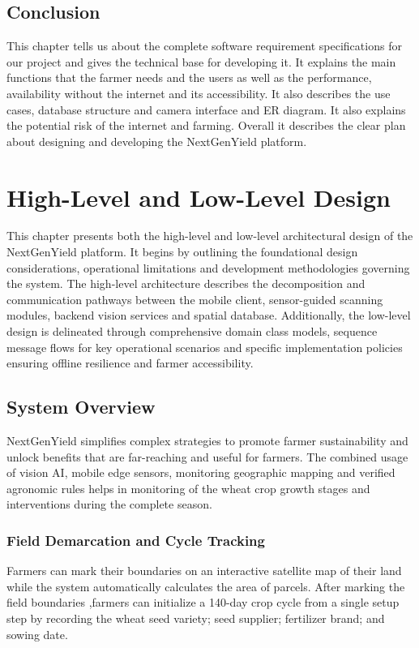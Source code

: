 \documentclass{FastFyp}
\begin{document}
\section{Conclusion}
This chapter tells us about the complete software requirement specifications for our project and gives the technical base for developing it. It explains the main functions that the farmer needs and the users as well as the performance, availability without the internet and its accessibility. It also describes the use cases, database structure and camera interface and ER diagram. It also explains the potential risk of the internet and farming. Overall it describes the clear plan about designing and developing the NextGenYield platform. 

\chapter{High-Level and Low-Level Design}
This chapter presents both the high-level and low-level architectural design of the NextGenYield platform. It begins by outlining the foundational design considerations, operational limitations and development methodologies governing the system. The high-level architecture describes the decomposition and communication pathways between the mobile client, sensor-guided scanning modules, backend vision services and spatial database. Additionally, the low-level design is delineated through comprehensive domain class models, sequence message flows for key operational scenarios and specific implementation policies ensuring offline resilience and farmer accessibility.

 
\section{System Overview}
NextGenYield simplifies complex strategies to promote farmer sustainability and unlock benefits that are far-reaching and useful for farmers. The combined usage of vision AI, mobile edge sensors, monitoring geographic mapping and verified agronomic rules helps in monitoring of the wheat crop growth stages and interventions during the complete season. 

\subsection{Field Demarcation and Cycle Tracking}

Farmers can mark their boundaries on an interactive satellite map of their land while the system automatically calculates the area of parcels. After marking the field boundaries ,farmers can initialize a 140-day crop cycle from a single setup step by recording the wheat seed variety; seed supplier; fertilizer brand; and sowing date.
\end{document}
